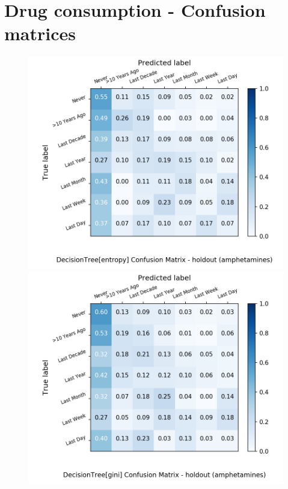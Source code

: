 \section{Drug consumption - Confusion matrices}\label{app:drug_conf_matr}

\begin{figure}[H]
	\centering
	\begin{minipage}[b]{0.32\textwidth}
		\includegraphics[width=1.1\textwidth]{Plots/drugs/amphetamines_DecisionTree_entropy_balance_False_holdout.png}
	\end{minipage}
	\begin{minipage}[b]{0.32\textwidth}
		\includegraphics[width=1.1\textwidth]{Plots/drugs/amphetamines_DecisionTree_gini_balance_False_holdout.png}

\end{minipage}
\end{figure}

